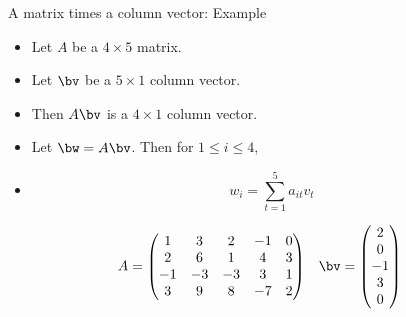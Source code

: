 \documentclass{beamer}
\begin{document}

\begin{frame}{A matrix times a column vector: Example}

\begin{itemize}
\item Let $A$ be a $4 \times 5$ matrix.
\item Let $\bv$ be a $5\times 1$ column vector.
\item Then $A \bv$ is a $4 \times 1$ column vector.
\item Let $\bw=A \bv$. Then for $1\leq i \leq 4$,
\item $$w_i = \sum_{t=1}^5 a_{it} v_{t}$$
\end{itemize}

$$
\begin{matrix}
A =

\begin{pmatrix}
1 & 3 & 2 & -1 & 0 \\
2 & 6 & 1 & 4 & 3\\
-1 & -3 & -3 & 3 & 1 \\
3 & 9 & 8 & -7 & 2
\end{pmatrix}

&

\bv =

\begin{pmatrix}
2 \\ 0 \\ -1 \\ 3 \\ 0
\end{pmatrix}
\end{matrix}
$$

\end{frame}

\end{document}
